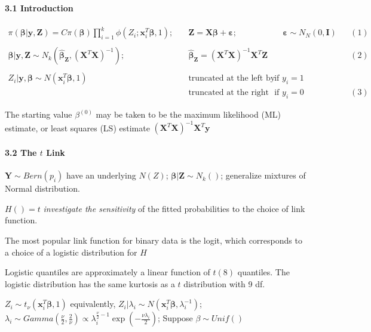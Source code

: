 \documentclass[
]{article}
\begin{document}
\hypertarget{introduction-1}{%
\paragraph{3.1 Introduction}\label{introduction-1}}

\[
\begin{align} 
\pi(\boldsymbol{\beta|y,Z}) = C\pi(\boldsymbol{\beta})\prod_{i=1}^{k}\phi (Z_{i};\mathbf{x}_i^T\boldsymbol{\beta},1); &\quad\mathbf{Z}=\mathbf{X}\boldsymbol{\beta+\varepsilon}; &\quad \boldsymbol{\varepsilon}\sim N_N(0,\mathbf{I})&&(1)\\
\\
\boldsymbol{\beta}|\mathbf{y,Z}\sim N_k(\boldsymbol{\hat\beta_Z},(\mathbf{X}^T\mathbf{X})^{-1}); &\quad\boldsymbol{\hat\beta_Z}=(\mathbf{X}^T\mathbf{X})^{-1}\mathbf{X}^T\mathbf{Z}&&& (2)\\
\\
Z_i|\boldsymbol{y,\beta}\sim N(\mathbf{x}_i^T\boldsymbol{\beta},1) &\quad\text{truncated at the left by 0} & \text{if } y_i=1 &&\\
 &\quad\text{truncated at the right by 0} & \text{if } y_i=0 &&(3)
\end{align}
\]

The starting value \(\beta^{(0)}\) may be taken to be the maximum
likelihood (ML) estimate, or least squares (LS) estimate
\((\mathbf{X}^T\mathbf{X})^{-1}\mathbf{X}^T\mathbf{y}\)

\hypertarget{the-t-link}{%
\paragraph{\texorpdfstring{3.2 The \(t\)
Link}{3.2 The t Link}}\label{the-t-link}}

\(\mathbf{Y}\sim Bern(p_i)\) have an underlying \(N(Z)\);
\(\boldsymbol{\beta}|\mathbf{Z}\sim N_k()\); generalize mixtures of
Normal distribution.

\(H()=t\) \emph{investigate the sensitivity} of the fitted probabilities
to the choice of link function.

The most popular link function for binary data is the logit, which
corresponds to a choice of a logistic distribution for \(H\)

Logistic quantiles are approximately a linear function of \(t(8)\)
quantiles. The logistic distribution has the same kurtosis as a \(t\)
distribution with 9 df.

\(Z_i\sim t_{\nu}(\mathbf{x}_i^T\boldsymbol{\beta},1)\) equivalently,
\(Z_i|\lambda_i\sim N(\mathbf{x}_i^T\boldsymbol{\beta},\lambda_i^{-1})\);
\(\lambda_i\sim Gamma(\frac{\nu}{2},\frac{2}{\nu})\propto\lambda_i^{\frac{\nu}{2}-1}\exp(-\frac{\nu\lambda_i}{2})\);
Suppose \(\beta\sim Unif()\)
\end{document}
